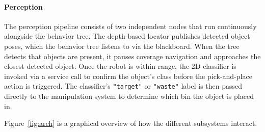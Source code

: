     \paragraph{Perception}
    The perception pipeline consists of two independent nodes that run continuously alongside the behavior tree. The depth-based locator publishes detected object poses, which the behavior tree listens to via the blackboard. When the tree detects that objects are present, it pauses coverage navigation and approaches the closest detected object. Once the robot is within range, the 2D classifier is invoked via a service call to confirm the object's class before the pick-and-place action is triggered. The classifier's \texttt{"target"} or \texttt{"waste"} label is then passed directly to the manipulation system to determine which bin the object is placed in.

    Figure~\ref{fig:arch} is a graphical overview of how the different subsystems interact.

